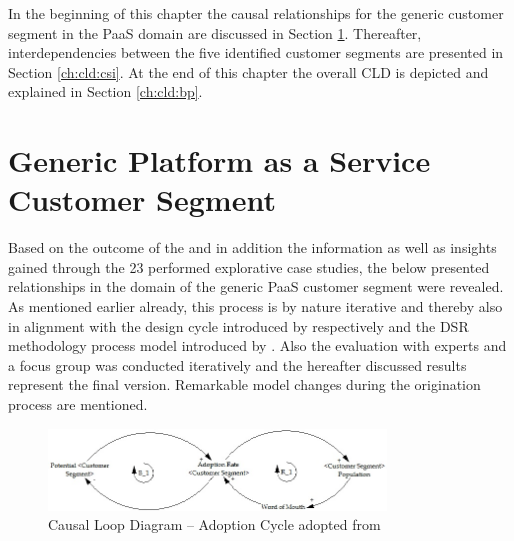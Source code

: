 In the beginning of this chapter the causal relationships for the generic customer segment in the \ac{PaaS} domain are discussed in Section \ref{ch:cld:cs}. Thereafter, interdependencies between the five identified customer segments are presented in Section \ref{ch:cld:csi}. At the end of this chapter the overall \ac{CLD} is depicted and explained in Section \ref{ch:cld:bp}.

\section{Generic Platform as a Service Customer Segment}\label{ch:cld:cs}

Based on the outcome of the  and in addition the information as well as insights gained through the 23 performed explorative case studies, the below presented relationships in the domain of the generic \ac{PaaS} customer segment were revealed. As mentioned earlier already, this process is by nature iterative and thereby also in alignment with the design cycle introduced by \citet{Hevner2004} respectively \citet{Hevner2007} and the \ac{DSR} methodology process model introduced by \citet{Peffers2007}. Also the evaluation with experts and a focus group was conducted iteratively and the hereafter discussed results represent the final version. Remarkable model changes during the origination process are mentioned.

\begin{figure}[tb]
	\centering
	\includegraphics[width=0.8\textwidth]{gfx/cld_adoptionRate}
	\caption[Causal Loop Diagram -- Adoption Cycle]{Causal Loop Diagram -- Adoption Cycle adopted from \citet[p. 18]{Sterman2001}}
	\label{fig:cld_ac}
\end{figure}

